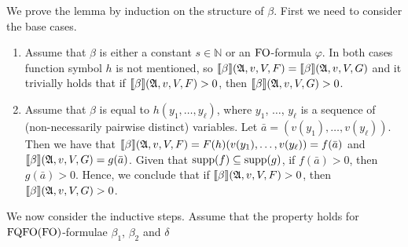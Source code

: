 
We prove the lemma by induction on the structure of $\beta$. First we need to consider the base cases.
\begin{enumerate}
\item Assume that $\beta$ is either a constant $s \in \mathbb{N}$ or an ${\rm FO}$-formula $\varphi$. In both cases function symbol $h$ is not mentioned, so ${\llbracket{}{\beta}\rrbracket}(\mathfrak{A},v,V,F) = {\llbracket{}{\beta}\rrbracket}(\mathfrak{A},v,V,G)$ and it trivially holds that if ${\llbracket{}{\beta}\rrbracket}(\mathfrak{A},v,V,F) > 0$, then ${\llbracket{}{\beta}\rrbracket}(\mathfrak{A},v,V,G) > 0$.

\item Assume that $\beta$ is equal to $h(y_1, \ldots, y_\ell)$, where $y_1$, $\ldots$, $y_\ell$ is a sequence of (non-necessarily pairwise distinct) variables. Let $\bar a = (v(y_1), \ldots, v(y_\ell))$. Then we have that ${\llbracket{}{\beta}\rrbracket}(\mathfrak{A},v,V,F) = F(h)(v(y_1), \ldots, v(y_\ell)) = f(\bar a)$ and ${\llbracket{}{\beta}\rrbracket}(\mathfrak{A},v,V,G) = g(\bar a)$. Given that $\text{\rm supp}(f) \subseteq \text{\rm supp}(g)$, if $f(\bar a) > 0$, then $g(\bar a) > 0$. Hence, we conclude that if ${\llbracket{}{\beta}\rrbracket}(\mathfrak{A},v,V,F) > 0$, then ${\llbracket{}{\beta}\rrbracket}(\mathfrak{A},v,V,G) > 0$.
\end{enumerate}
We now consider the inductive steps. Assume that the property holds for ${\rm FQFO}({\rm FO})$-formulae $\beta_1$, $\beta_2$ and $\delta$
